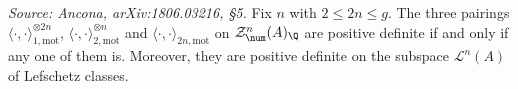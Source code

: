 \begin{proposition}
  \label{prop:scht-lefschetz}
  \textit{Source: Ancona, arXiv:1806.03216, §5.}
  Fix \(n\) with \(2 \le 2n \le g\). The three pairings
  \(\langle \cdot, \cdot \rangle_{1,\mathrm{mot}}^{\otimes 2n}\),
  \(\langle \cdot, \cdot \rangle_{2,\mathrm{mot}}^{\otimes n}\) and
  \(\langle \cdot, \cdot \rangle_{2n,\mathrm{mot}}\) on
  \(\mathcal{Z}^{n}_{\num}(A)_{\Q}\) are positive definite if and only if any one
  of them is. Moreover, they are positive definite on the subspace
  \(\mathcal{L}^{n}(A)\) of Lefschetz classes.
\end{proposition}

